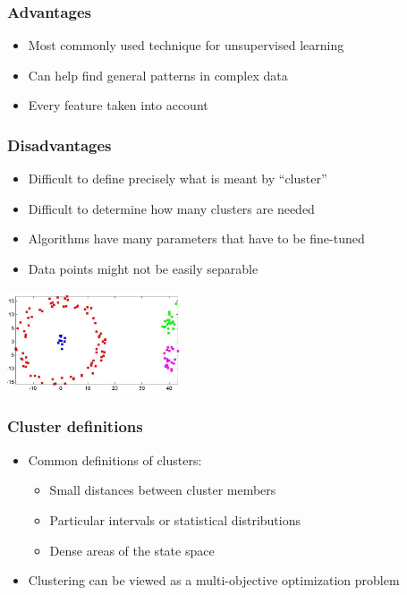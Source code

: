 \documentclass[10pt]{beamer}
\begin{document}
\begin{frame}
  \frametitle{Advantages}
  \begin{itemize}
    \item Most commonly used technique for unsupervised learning
	\item Can help find general patterns in complex data
	\item Every feature taken into account
  \end{itemize}
\end{frame}

\begin{frame}
  \frametitle{Disadvantages}
  \begin{itemize}
    \item Difficult to define precisely what is meant by ``cluster''
    \item Difficult to determine how many clusters are needed
	\item Algorithms have many parameters that have to be fine-tuned
    \item Data points might not be easily separable
  \end{itemize}
  \centerline{\includegraphics[height=3cm]{images/difficult2.jpg}}
\end{frame}

\begin{frame}
  \frametitle{Cluster definitions}
  \begin{itemize}
	\item Common definitions of clusters:
  \begin{itemize}
    \item Small distances between cluster members
	\item Particular intervals or statistical distributions
	\item Dense areas of the state space
  \end{itemize}
	\item Clustering can be viewed as a multi-objective optimization problem
  \end{itemize}
\end{frame}
\end{document}
